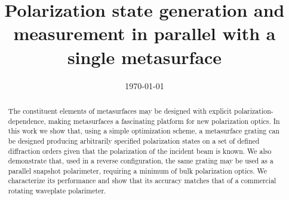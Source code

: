 \documentclass[footinbib,aps,prl,twocolumn,superscriptaddress]{revtex4-1}
\begin{document}

\title{Polarization state generation and measurement in parallel with a single metasurface}




\date{\today}

\begin{abstract}
The constituent elements of metasurfaces may be designed with explicit polarization-dependence, making metasurfaces a fascinating platform for new polarization optics. In this work we show that, using a simple optimization scheme, a metasurface grating can be designed producing arbitrarily specified polarization states on a set of defined diffraction orders given that the polarization of the incident beam is known. We also demonstrate that, used in a reverse configuration, the same grating may be used as a parallel snapshot polarimeter, requiring a minimum of bulk polarization optics. We characterize its performance and show that its accuracy matches that of a commercial rotating waveplate polarimeter.
\end{abstract}
\end{document}
